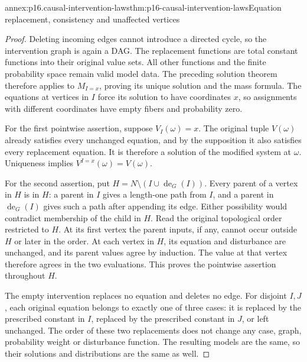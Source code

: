 \begin{annexitem}{annex:p16.causal-intervention-laws}{thm:p16-causal-intervention-laws}{Equation replacement, consistency and unaffected vertices}
\begin{proof}
Deleting incoming edges cannot introduce a directed cycle, so the
intervention graph is again a DAG. The replacement functions are total
constant functions into their original value sets. All other functions
and the finite probability space remain valid model data. The preceding
solution theorem therefore applies to \(M_{I=x}\), proving its
unique solution and the mass formula. The equations at vertices in
\(I\) force its solution to have coordinates \(x\), so assignments
with different coordinates have empty fibers and probability zero.

For the first pointwise assertion, suppose \(V_I(\omega)=x\).
The original tuple \(V(\omega)\) already satisfies every unchanged
equation, and by the supposition it also satisfies every replacement
equation. It is therefore a solution of the modified system at
\(\omega\). Uniqueness implies
\(V^{I=x}(\omega)=V(\omega)\).

For the second assertion, put
\(H=N\setminus(I\cup\operatorname{de}_G(I))\). Every parent of
a vertex in \(H\) is in \(H\): a parent in \(I\) gives a
length-one path from \(I\), and a parent in
\(\operatorname{de}_G(I)\) gives such a path after appending its
edge. Either possibility would contradict membership of the child in
\(H\). Read the original topological order restricted to \(H\).
At its first vertex the parent inputs, if any, cannot occur outside
\(H\) or later in the order. At each vertex in \(H\), its equation
and disturbance are unchanged, and its parent values agree by induction.
The value at that vertex therefore agrees in the two evaluations. This
proves the pointwise assertion throughout \(H\).

The empty intervention replaces no equation and deletes no edge. For
disjoint \(I,J\), each original equation belongs to exactly one of
three cases: it is replaced by the prescribed constant in \(I\),
replaced by the prescribed constant in \(J\), or left unchanged.
The order of these two replacements does not change any case, graph,
probability weight or disturbance function. The resulting models are the
same, so their solutions and distributions are the same as well.
\end{proof}
\end{annexitem}

